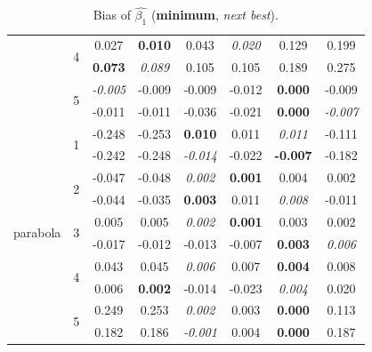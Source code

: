 \documentclass[authoryear, review, 11pt]{elsarticle}
\begin{document}
\begin{table}
\begin{center}
\begin{tabular}{cccccccc}
   & \multirow{2}{*}{4} & 0.027 & \textbf{0.010} & 0.043 & \emph{0.020} & 0.129 & 0.199 \\ 
   &  & \textbf{0.073} & \emph{0.089} & 0.105 & 0.105 & 0.189 & 0.275 \\ 
   \cline{3-8}
   & \multirow{2}{*}{5} & \emph{-0.005} & -0.009 & -0.009 & -0.012 & \textbf{0.000} & -0.009 \\ 
   &  & -0.011 & -0.011 & -0.036 & -0.021 & \textbf{0.000} & \emph{-0.007} \\ 
   \hline
   \multirow{10}{*}{parabola} & \multirow{2}{*}{1} & -0.248 & -0.253 & \textbf{0.010} & 0.011 & \emph{0.011} & -0.111 \\ 
   &  & -0.242 & -0.248 & \emph{-0.014} & -0.022 & \textbf{-0.007} & -0.182 \\ 
   \cline{3-8}
   & \multirow{2}{*}{2} & -0.047 & -0.048 & \emph{0.002} & \textbf{0.001} & 0.004 & 0.002 \\ 
   &  & -0.044 & -0.035 & \textbf{0.003} & 0.011 & \emph{0.008} & -0.011 \\ 
   \cline{3-8}
   & \multirow{2}{*}{3} & 0.005 & 0.005 & \emph{0.002} & \textbf{0.001} & 0.003 & 0.002 \\ 
   &  & -0.017 & -0.012 & -0.013 & -0.007 & \textbf{0.003} & \emph{0.006} \\ 
   \cline{3-8}
   & \multirow{2}{*}{4} & 0.043 & 0.045 & \emph{0.006} & 0.007 & \textbf{0.004} & 0.008 \\ 
   &  & 0.006 & \textbf{0.002} & -0.014 & -0.023 & \emph{0.004} & 0.020 \\ 
   \cline{3-8}
   & \multirow{2}{*}{5} & 0.249 & 0.253 & \emph{0.002} & 0.003 & \textbf{0.000} & 0.113 \\ 
   &  & 0.182 & 0.186 & \emph{-0.001} & 0.004 & \textbf{0.000} & 0.187 \\ 
  \end{tabular}
\caption{Bias of $\hat{\beta_1}$ (\textbf{minimum}, \emph{next best}).\label{table:X1-bias}} 
\end{center}
\end{table}
\end{document}

